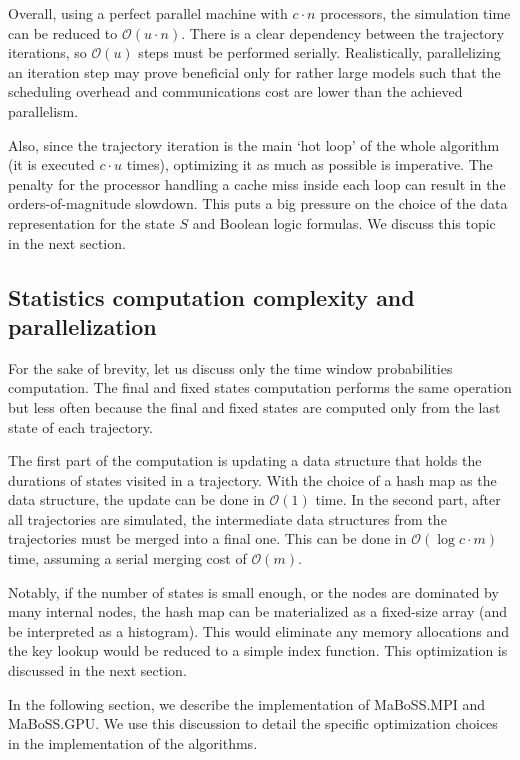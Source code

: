 \documentclass[times, twoside]{zHenriquesLab-StyleBioRxiv}
\begin{document}
Overall, using a perfect parallel machine with $c \cdot n$ processors, the simulation time can be reduced to $\mathcal{O}(u \cdot n)$. There is a clear dependency between the trajectory iterations, so $\mathcal{O}(u)$ steps must be performed serially. Realistically, parallelizing an iteration step may prove beneficial only for rather large models such that the scheduling overhead and communications cost are lower than the achieved parallelism.

Also, since the trajectory iteration is the main `hot loop' of the whole algorithm (it is executed $c \cdot u$ times), optimizing it as much as possible is imperative. The penalty for the processor handling a cache miss inside each loop can result in the orders-of-magnitude slowdown. This puts a big pressure on the choice of the data representation for the state $S$ and Boolean logic formulas. We discuss this topic in the next section. 

\subsection*{Statistics computation complexity and parallelization}

For the sake of brevity, let us discuss only the time window probabilities computation. The final and fixed states computation performs the same operation but less often because the final and fixed states are computed only from the last state of each trajectory.

The first part of the computation is updating a data structure that holds the durations of states visited in a trajectory. With the choice of a hash map as the data structure, the update can be done in $\mathcal{O}(1)$ time. In the second part, after all trajectories are simulated, the intermediate data structures from the trajectories must be merged into a final one. This can be done in $\mathcal{O}(\log{c} \cdot m)$ time, assuming a serial merging cost of $\mathcal{O}(m)$.

Notably, if the number of states is small enough, or the nodes are dominated by many internal nodes, the hash map can be materialized as a fixed-size array (and be interpreted as a histogram). This would eliminate any memory allocations and the key lookup would be reduced to a simple index function. This optimization is discussed in the next section.

In the following section, we describe the implementation of MaBoSS.MPI and MaBoSS.GPU. We use this discussion to detail the specific optimization choices in the implementation of the algorithms.
\end{document}
